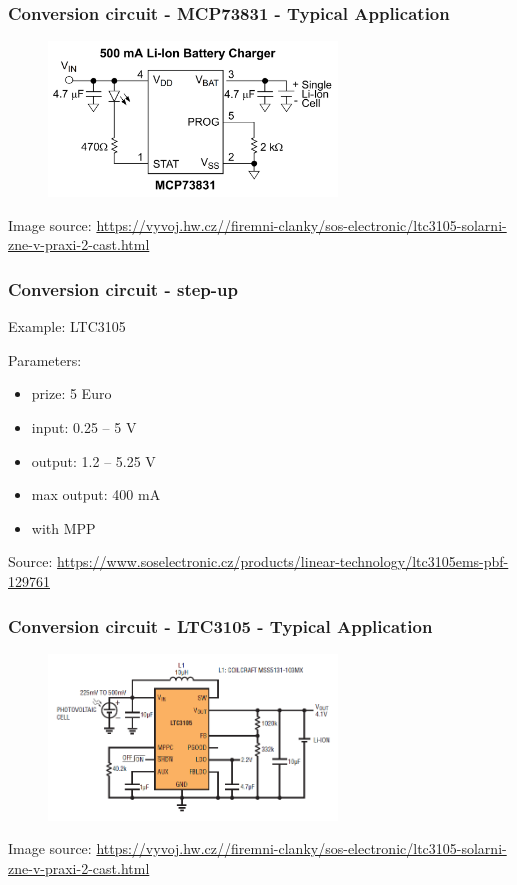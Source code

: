 \documentclass[12;pt,t]{beamer} %
\newcommand{\srctext}[1]{{\fontsize{7}{9}\selectfont\textcolor{sourcesclr}{#1}}}
\begin{document}
\begin{frame}
    \frametitle{Conversion circuit - MCP73831 - Typical Application}    	
        \begin{figure}[H]
            \includegraphics[width=290px]{img/mcp73831-base-circuit.png}
       	\end{figure}
    \srctext{Image source:  \url{https://vyvoj.hw.cz//firemni-clanky/sos-electronic/ltc3105-solarni-zne-v-praxi-2-cast.html}}
\end{frame}


\begin{frame}
    \frametitle{Conversion circuit - step-up}
    Example: LTC3105
   
   \vspace{5mm}
   Parameters:
 	\begin{itemize}
		\item prize: 5 Euro
        \item input: 0.25 – 5 V
        \item output: 1.2 – 5.25 V
        \item max output: 400 mA
        \item with MPP
   	\end{itemize}
    \srctext{Source: \url{https://www.soselectronic.cz/products/linear-technology/ltc3105ems-pbf-129761}}
\end{frame}

\begin{frame}
    \frametitle{Conversion circuit - LTC3105 - Typical Application}    	
        \begin{figure}[H]
            \includegraphics[width=290px]{img/ltc3105-base-circuit.png}
       	\end{figure}
    \srctext{Image source:  \url{https://vyvoj.hw.cz//firemni-clanky/sos-electronic/ltc3105-solarni-zne-v-praxi-2-cast.html}}
\end{frame}
\end{document}
